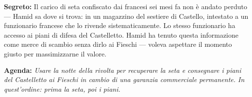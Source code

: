 \clearpage

\begin{secretbox}
  \textbf{Segreto:} Il carico di seta confiscato dai francesi sei mesi fa
  non è andato perduto — Hamid sa dove si trova: in un magazzino del sestiere
  di Castello, intestato a un funzionario francese che lo rivende
  sistematicamente. Lo stesso funzionario ha accesso ai piani di
  difesa del Castelletto. Hamid ha tenuto questa informazione come
  merce di scambio senza dirlo ai Fieschi — voleva aspettare il momento
  giusto per massimizzarne il valore.

  \medskip\noindent\textcolor{SecretRed}{\textbf{Agenda:}}
  \textit{Usare la notte della rivolta per recuperare la seta e consegnare
  i piani del Castelletto ai Fieschi in cambio di una garanzia commerciale
  permanente. In quest'ordine: prima la seta, poi i piani.}
\end{secretbox}
